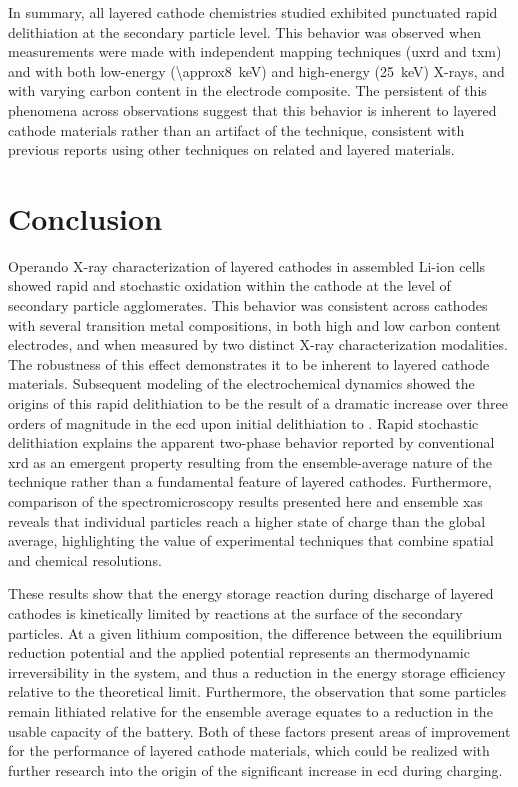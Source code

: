 \documentclass{article}
\begin{document}
In summary, all layered cathode chemistries studied exhibited
punctuated rapid delithiation at the secondary particle level. This
behavior was observed when measurements were made with independent
mapping techniques (\gls{uxrd} and \gls{txm}) and with both low-energy
(\SI{\approx8}{\kilo\electronvolt}) and high-energy
(\SI{25}{\kilo\electronvolt}) X-rays, and with varying carbon content
in the electrode composite. The persistent of this phenomena across
observations suggest that this behavior is inherent to layered cathode
materials rather than an artifact of the technique, consistent with
previous reports using other techniques on related \nmc{} and
 layered
materials\cite{chueh2021,rao2021,wang2020-6}. 

\section{Conclusion}

Operando X-ray characterization of layered cathodes in assembled
Li-ion cells showed rapid and stochastic oxidation within the cathode
at the level of secondary particle agglomerates. This behavior was
consistent across cathodes with several transition metal compositions,
in both high and low carbon content electrodes, and when measured by
two distinct X-ray characterization modalities. The robustness of this
effect demonstrates it to be inherent to layered cathode
materials. Subsequent modeling of the electrochemical dynamics showed
the origins of this rapid delithiation to be the result of a dramatic
increase over three orders of magnitude in the \gls{ecd} upon initial
delithiation to . Rapid stochastic delithiation explains the
apparent two-phase behavior reported by conventional \gls{xrd} as an
emergent property resulting from the ensemble-average nature of the
technique rather than a fundamental feature of layered
cathodes. Furthermore, comparison of the spectromicroscopy results
presented here and ensemble \gls{xas} reveals that individual
particles reach a higher state of charge than the global average,
highlighting the value of experimental techniques that combine spatial
and chemical resolutions.

These results show that the energy storage reaction during discharge
of layered cathodes is kinetically limited by reactions at the surface
of the secondary particles. At a given lithium composition, the
difference between the equilibrium reduction potential and the applied
potential represents an thermodynamic irreversibility in the system,
and thus a reduction in the energy storage efficiency relative to the
theoretical limit. Furthermore, the observation that some particles
remain lithiated relative for the ensemble average equates to a
reduction in the usable capacity of the battery. Both of these factors
present areas of improvement for the performance of layered cathode
materials, which could be realized with further research into the
origin of the significant increase in \gls{ecd} during charging.
\end{document}
